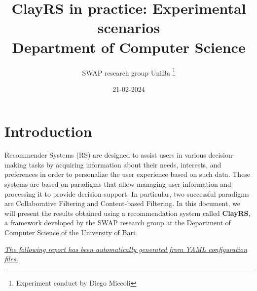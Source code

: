 \documentclass[11pt]{article}
\title{\textbf{ ClayRS in practice: Experimental scenarios }\\ [1cm] Department of Computer Science}
\author{ SWAP research group UniBa \thanks{Experiment conduct by Diego Miccoli}}
\date{21-02-2024}
\begin{document}
\maketitle

\section{Introduction}\label{sec:intro}
Recommender Systems (RS) are designed to assist users in various decision-making tasks by acquiring
information about their needs, interests, and preferences in order to personalize the user experience
based on such data.
These systems are based on paradigms that allow managing user information and processing
it to provide decision support.
In particular, two successful paradigms are Collaborative Filtering and Content-based Filtering.
In this document, we will present the results obtained using a recommendation system called \textbf{ClayRS},
a framework developed by the SWAP research group at the Department of Computer Science of the University of Bari.\\
\hfill\break

\textit{\ul{The following report has been automatically generated from YAML configuration files.}}

\hfill\break
\end{document}
